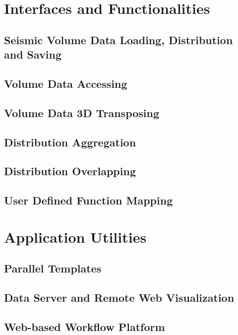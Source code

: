 \section{Interfaces and Functionalities}

\subsection{Seismic Volume Data Loading,  Distribution and Saving}

\subsection{Volume Data Accessing}

\subsection{Volume Data 3D Transposing}

\subsection{Distribution Aggregation}

\subsection{Distribution Overlapping}

\subsection{User Defined Function Mapping}


\section{Application Utilities}

\subsection{Parallel Templates}

\subsection{Data Server and Remote Web Visualization}

\subsection{Web-based Workflow Platform}

